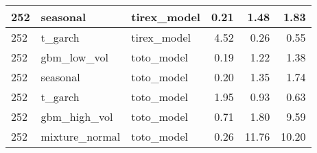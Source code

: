 {\begin{tabular}{lllrrr}
\midrule
252 & seasonal & tirex\_model & 0.21 & 1.48 & 1.83 \\
\midrule
252 & t\_garch & tirex\_model & 4.52 & 0.26 & 0.55 \\
\midrule
252 & gbm\_low\_vol & toto\_model & 0.19 & 1.22 & 1.38 \\
\midrule
252 & seasonal & toto\_model & 0.20 & 1.35 & 1.74 \\
\midrule
252 & t\_garch & toto\_model & 1.95 & 0.93 & 0.63 \\
\midrule
252 & gbm\_high\_vol & toto\_model & 0.71 & 1.80 & 9.59 \\
\midrule
252 & mixture\_normal & toto\_model & 0.26 & 11.76 & 10.20 \\
\bottomrule
\end{tabular}
}
